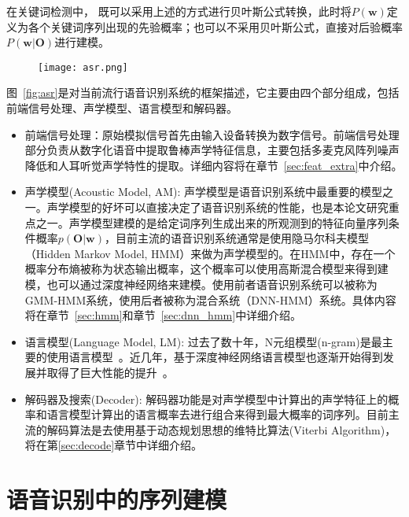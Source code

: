 在关键词检测中， 既可以采用上述的方式进行贝叶斯公式转换，此时将$P(\mathbf{w})$定义为各个关键词序列出现的先验概率；也可以不采用贝叶斯公式，直接对后验概率$P(\mathbf{w}|\mathbf{O})$进行建模。

\begin{figure}[!htp]
  \centering
    \captionstyle{\centering}
    \texttt{[image: asr.png]}
\end{figure}

图~\ref{fig:asr}是对当前流行语音识别系统的框架描述，它主要由四个部分组成，包括前端信号处理、声学模型、语言模型和解码器。
\begin{itemize}
    \item 前端信号处理：原始模拟信号首先由输入设备转换为数字信号。前端信号处理部分负责从数字化语音中提取鲁棒声学特征信息，主要包括多麦克风阵列噪声降低和人耳听觉声学特性的提取。详细内容将在章节~\ref{sec:feat_extra}中介绍。
    \item 声学模型(Acoustic Model, AM): 声学模型是语音识别系统中最重要的模型之一。声学模型的好坏可以直接决定了语音识别系统的性能，也是本论文研究重点之一。声学模型建模的是给定词序列生成出来的所观测到的特征向量序列条件概率$p(\mathbf{O}|\mathbf{w})$，目前主流的语音识别系统通常是使用隐马尔科夫模型（Hidden Markov Model, HMM）来做为声学模型的。在HMM中，存在一个概率分布熵被称为状态输出概率，这个概率可以使用高斯混合模型来得到建模，也可以通过深度神经网络来建模。使用前者语音识别系统可以被称为GMM-HMM系统，使用后者被称为混合系统（DNN-HMM）系统。具体内容将在章节~\ref{sec:hmm}和章节~\ref{sec:dnn_hmm}中详细介绍。
    \item 语言模型(Language Model, LM): 过去了数十年，N元组模型(n-gram)是最主要的使用语言模型~\cite{good1953population,katz1987estimation,brown1992class}。近几年，基于深度神经网络语言模型也逐渐开始得到发展并取得了巨大性能的提升~\cite{mikolov2010recurrent,mikolov2012statistical}。
    \item 解码器及搜索(Decoder): 解码器功能是对声学模型中计算出的声学特征上的概率和语言模型计算出的语言概率去进行组合来得到最大概率的词序列。目前主流的解码算法是去使用基于动态规划思想的维特比算法(Viterbi Algorithm)，将在第\ref{sec:decode}章节中详细介绍。
\end{itemize}

\section{语音识别中的序列建模}
\label{chap:intro0-seq-model}

